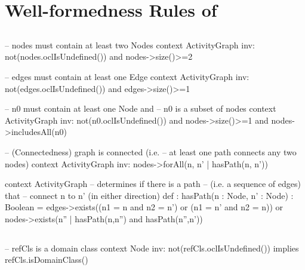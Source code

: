 %
\section{Well-formedness Rules of \agl} \label{apex:agl-rules}
%
\subsection{}
\begin{lstrule}
-- nodes must contain at least two Nodes
context ActivityGraph inv:
  not(nodes.oclIsUndefined()) and 
  nodes->size()>=2
\end{lstrule}

\begin{lstrule}
-- edges must contain at least one Edge
context ActivityGraph inv:
  not(edges.oclIsUndefined()) and 
  edges->size()>=1
\end{lstrule}

\begin{lstrule}
-- n0 must contain at least one Node and 
-- n0 is a subset of nodes
context ActivityGraph inv:
  not(n0.oclIsUndefined()) and 
  nodes->size()>=1 and nodes->includesAll(n0)
\end{lstrule}

\begin{lstrule}
-- (Connectedness) graph is connected (i.e. 
-- at least one path connects any two nodes)
context ActivityGraph inv:
  nodes->forAll(n, n' | hasPath(n, n'))
\end{lstrule}

\begin{lstrule}  
context ActivityGraph  
-- determines if there is a path 
-- (i.e. a sequence of edges) that 
-- connect n to n' (in either direction)
def : hasPath(n : Node, n' : Node) : Boolean = 
  edges->exists((n1 = n and n2 = n') or 
                  (n1 = n' and n2 = n)) 
  or
  nodes->exists(n'' | hasPath(n,n'') and hasPath(n'',n')) 
\end{lstrule}


%
\subsection{}
\begin{lstrule}
-- refCls is a domain class
context Node inv:
  not(refCls.oclIsUndefined()) implies refCls.isDomainClass()
\end{lstrule}

